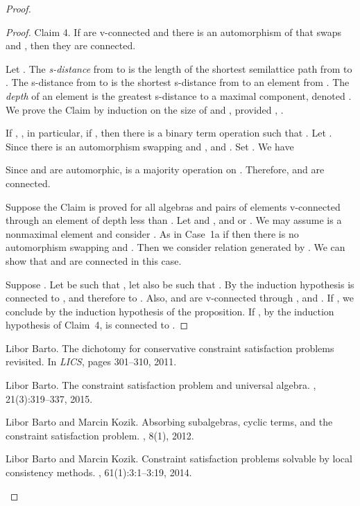 \documentclass[11pt]{article}
\begin{document}
\begin{proof}
\begin{proof}
\smallskip

{\sc Claim 4.}
If  are v-connected and there is an automorphism of  that swaps  
and , then they are connected.

\smallskip

Let . The \emph{s-distance} from  to  is the length of the 
shortest semilattice path from  to . The s-distance from  to  is 
the shortest s-distance from  to an element from . The \emph{depth} 
of an element  is the greatest s-distance to a maximal  
component, denoted . We prove the Claim by induction on the size of 
 and , provided , .

If , , in particular, if , then there is a binary term 
operation  such that . Let . Since there is an automorphism 
swapping  and ,  and . 
Set . We have

Since  and  are automorphic,  is a majority operation on . 
Therefore,  and  are connected.


Suppose the Claim is proved for all algebras and pairs of elements v-connected 
through an element of depth less than . Let  
and , and  or . We may assume 
 is a nonmaximal element and consider . As in 
Case~1a if  then there is no automorphism swapping  
and . Then we consider relation  generated by 
. We can show that  and  are connected in this case.  

Suppose . Let  be such that , let also 
 be such that . By the induction hypothesis  is connected 
to , and therefore to . Also,  and  are v-connected through , 
and . If , we conclude by the induction 
hypothesis of the proposition. If , by the induction hypothesis of 
Claim~4,  is connected to .
\end{proof}


\begin{thebibliography}{10}

Libor Barto.
\newblock The dichotomy for conservative constraint satisfaction problems
  revisited.
\newblock In {\em {LICS}}, pages 301--310, 2011.

Libor Barto.
\newblock The constraint satisfaction problem and universal algebra.
, 21(3):319--337, 2015.

Libor Barto and Marcin Kozik.
\newblock Absorbing subalgebras, cyclic terms, and the constraint satisfaction
  problem.
, 8(1), 2012.

Libor Barto and Marcin Kozik.
\newblock Constraint satisfaction problems solvable by local consistency
  methods.
, 61(1):3:1--3:19, 2014.


\end{thebibliography}
\end{proof}
\end{document}
